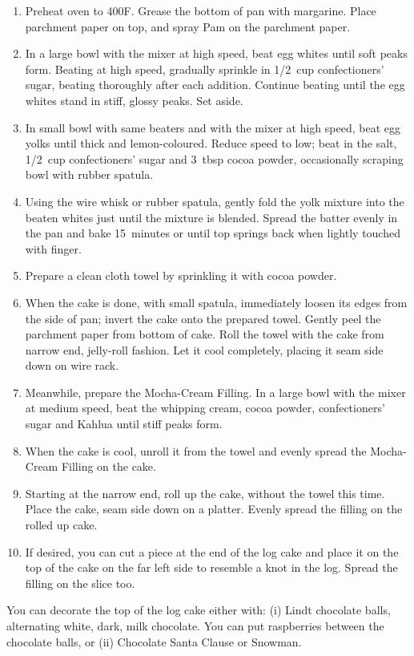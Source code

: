 \begin{enumerate}
    \item Preheat oven to 400\degree F. Grease the bottom of pan with margarine. Place parchment paper on top, and spray Pam on the parchment paper.
    \item In a large bowl with the mixer at high speed, beat egg whites until soft peaks form. Beating at high speed, gradually sprinkle in 1/2~cup confectioners' sugar, beating thoroughly after each addition. Continue beating until the egg whites stand in stiff, glossy peaks. Set aside.
    \item In small bowl with same beaters and with the mixer at high speed, beat egg yolks until thick and lemon-coloured. Reduce speed to low; beat in the salt, 1/2~cup confectioners' sugar and 3~tbsp cocoa powder, occasionally scraping bowl with rubber spatula.
    \item Using the wire whisk or rubber spatula, gently fold the yolk mixture into the beaten whites just until the mixture is blended. Spread the batter evenly in the pan and bake 15~minutes or until top springs back when lightly touched with finger.
    \item Prepare a clean cloth towel by sprinkling it with cocoa powder.
    \item When the cake is done, with small spatula, immediately loosen its edges from the side of pan; invert the cake onto the prepared towel. Gently peel the parchment paper from bottom of cake. Roll the towel with the cake from narrow end, jelly-roll fashion. Let it cool completely, placing it seam side down on wire rack.
    \item Meanwhile, prepare the Mocha-Cream Filling. In a large bowl with the mixer at medium speed, beat the whipping cream, cocoa powder, confectioners' sugar and Kahlua until stiff peaks form.
    \item When the cake is cool, unroll it from the towel and evenly spread the Mocha-Cream Filling on the cake.
    \item Starting at the narrow end, roll up the cake, without the towel this time. Place the cake, seam side down on a platter. Evenly spread the filling on the rolled up cake.
    \item If desired, you can cut a piece at the end of the log cake and place it on the top of the cake on the far left side to resemble a knot in the log. Spread the filling on the slice too.
\end{enumerate}

You can decorate the top of the log cake either with: (i) Lindt chocolate balls, alternating white, dark, milk chocolate. You can put raspberries between the chocolate balls, or (ii) Chocolate Santa Clause or Snowman.


